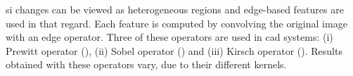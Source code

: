 \begin{enumerate}[leftmargin=*]
\Ac{si} changes can be viewed as heterogeneous regions and edge-based features are used in that regard. Each feature is computed by convolving the original image with an edge operator. Three of these operators are used in \ac{cad} systems: (i) Prewitt operator (\cite{Prewitt1970}), (ii) Sobel operator (\cite{Sobel1970}) and (iii) Kirsch operator (\cite{Kirsch1971}). Results obtained with these operators vary, due to their different kernels.%
%

\end{enumerate}

